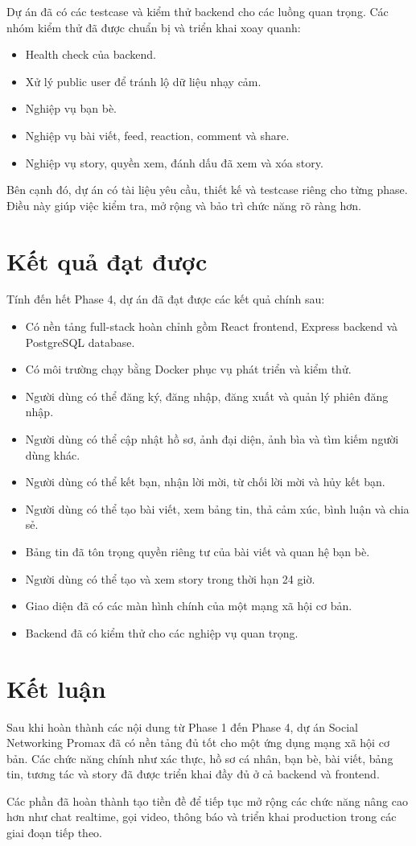 \documentclass[12pt,a4paper]{article}
\begin{document}
Dự án đã có các testcase và kiểm thử backend cho các luồng quan trọng. Các nhóm kiểm thử đã được chuẩn bị và triển khai xoay quanh:

\begin{itemize}
  \item Health check của backend.
  \item Xử lý public user để tránh lộ dữ liệu nhạy cảm.
  \item Nghiệp vụ bạn bè.
  \item Nghiệp vụ bài viết, feed, reaction, comment và share.
  \item Nghiệp vụ story, quyền xem, đánh dấu đã xem và xóa story.
\end{itemize}

Bên cạnh đó, dự án có tài liệu yêu cầu, thiết kế và testcase riêng cho từng phase. Điều này giúp việc kiểm tra, mở rộng và bảo trì chức năng rõ ràng hơn.

\section{Kết quả đạt được}

Tính đến hết Phase 4, dự án đã đạt được các kết quả chính sau:

\begin{itemize}
  \item Có nền tảng full-stack hoàn chỉnh gồm React frontend, Express backend và PostgreSQL database.
  \item Có môi trường chạy bằng Docker phục vụ phát triển và kiểm thử.
  \item Người dùng có thể đăng ký, đăng nhập, đăng xuất và quản lý phiên đăng nhập.
  \item Người dùng có thể cập nhật hồ sơ, ảnh đại diện, ảnh bìa và tìm kiếm người dùng khác.
  \item Người dùng có thể kết bạn, nhận lời mời, từ chối lời mời và hủy kết bạn.
  \item Người dùng có thể tạo bài viết, xem bảng tin, thả cảm xúc, bình luận và chia sẻ.
  \item Bảng tin đã tôn trọng quyền riêng tư của bài viết và quan hệ bạn bè.
  \item Người dùng có thể tạo và xem story trong thời hạn 24 giờ.
  \item Giao diện đã có các màn hình chính của một mạng xã hội cơ bản.
  \item Backend đã có kiểm thử cho các nghiệp vụ quan trọng.
\end{itemize}

\section{Kết luận}

Sau khi hoàn thành các nội dung từ Phase 1 đến Phase 4, dự án Social Networking Promax đã có nền tảng đủ tốt cho một ứng dụng mạng xã hội cơ bản. Các chức năng chính như xác thực, hồ sơ cá nhân, bạn bè, bài viết, bảng tin, tương tác và story đã được triển khai đầy đủ ở cả backend và frontend.

Các phần đã hoàn thành tạo tiền đề để tiếp tục mở rộng các chức năng nâng cao hơn như chat realtime, gọi video, thông báo và triển khai production trong các giai đoạn tiếp theo.
\end{document}
